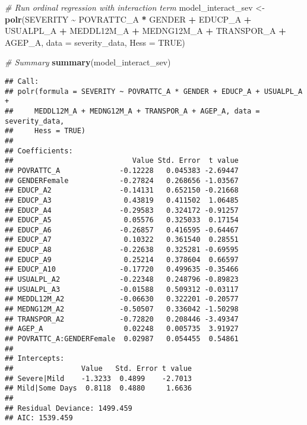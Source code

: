 \documentclass[
]{article}
\newenvironment{Shaded}{\begin{snugshade}}{\end{snugshade}}
\newcommand{\AttributeTok}[1]{\textcolor[rgb]{0.13,0.29,0.53}{#1}}
\newcommand{\CommentTok}[1]{\textcolor[rgb]{0.56,0.35,0.01}{\textit{#1}}}
\newcommand{\ConstantTok}[1]{\textcolor[rgb]{0.56,0.35,0.01}{#1}}
\newcommand{\FunctionTok}[1]{\textcolor[rgb]{0.13,0.29,0.53}{\textbf{#1}}}
\newcommand{\NormalTok}[1]{#1}
\newcommand{\OtherTok}[1]{\textcolor[rgb]{0.56,0.35,0.01}{#1}}
\newcommand{\SpecialCharTok}[1]{\textcolor[rgb]{0.81,0.36,0.00}{\textbf{#1}}}
\begin{document}
\begin{Shaded}
\begin{Highlighting}[]
\CommentTok{\# Run ordinal regression with interaction term}
\NormalTok{model\_interact\_sev }\OtherTok{\textless{}{-}} \FunctionTok{polr}\NormalTok{(SEVERITY }\SpecialCharTok{\textasciitilde{}}\NormalTok{ POVRATTC\_A }\SpecialCharTok{*}\NormalTok{ GENDER }\SpecialCharTok{+}\NormalTok{ EDUCP\_A }\SpecialCharTok{+} 
\NormalTok{                             USUALPL\_A }\SpecialCharTok{+}\NormalTok{ MEDDL12M\_A }\SpecialCharTok{+}\NormalTok{ MEDNG12M\_A }\SpecialCharTok{+} 
\NormalTok{                             TRANSPOR\_A }\SpecialCharTok{+}\NormalTok{ AGEP\_A,}
                           \AttributeTok{data =}\NormalTok{ severity\_data,}
                           \AttributeTok{Hess =} \ConstantTok{TRUE}\NormalTok{)}

\CommentTok{\# Summary}
\FunctionTok{summary}\NormalTok{(model\_interact\_sev)}
\end{Highlighting}
\end{Shaded}

\begin{verbatim}
## Call:
## polr(formula = SEVERITY ~ POVRATTC_A * GENDER + EDUCP_A + USUALPL_A + 
##     MEDDL12M_A + MEDNG12M_A + TRANSPOR_A + AGEP_A, data = severity_data, 
##     Hess = TRUE)
## 
## Coefficients:
##                            Value Std. Error  t value
## POVRATTC_A              -0.12228   0.045383 -2.69447
## GENDERFemale            -0.27824   0.268656 -1.03567
## EDUCP_A2                -0.14131   0.652150 -0.21668
## EDUCP_A3                 0.43819   0.411502  1.06485
## EDUCP_A4                -0.29583   0.324172 -0.91257
## EDUCP_A5                 0.05576   0.325033  0.17154
## EDUCP_A6                -0.26857   0.416595 -0.64467
## EDUCP_A7                 0.10322   0.361540  0.28551
## EDUCP_A8                -0.22638   0.325281 -0.69595
## EDUCP_A9                 0.25214   0.378604  0.66597
## EDUCP_A10               -0.17720   0.499635 -0.35466
## USUALPL_A2              -0.22348   0.248796 -0.89823
## USUALPL_A3              -0.01588   0.509312 -0.03117
## MEDDL12M_A2             -0.06630   0.322201 -0.20577
## MEDNG12M_A2             -0.50507   0.336042 -1.50298
## TRANSPOR_A2             -0.72820   0.208446 -3.49347
## AGEP_A                   0.02248   0.005735  3.91927
## POVRATTC_A:GENDERFemale  0.02987   0.054455  0.54861
## 
## Intercepts:
##                Value   Std. Error t value
## Severe|Mild    -1.3233  0.4899    -2.7013
## Mild|Some Days  0.8118  0.4880     1.6636
## 
## Residual Deviance: 1499.459 
## AIC: 1539.459
\end{verbatim}
\end{document}
